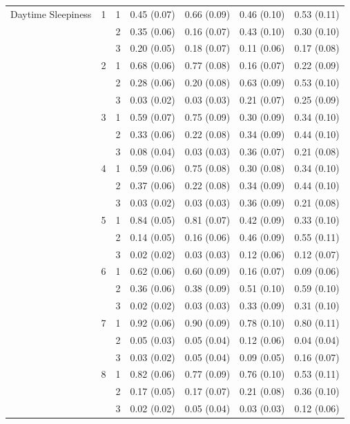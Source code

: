 \documentclass[11pt]{article}
\theoremstyle{plain}
\theoremstyle{definition}
\begin{document}
\begin{longtable}{clccccc}
Daytime Sleepiness &1 & 1  & 0.45 (0.07) & 0.66  (0.09) & 0.46  (0.10) & 0.53 (0.11) \\
 & & 2  & 0.35 (0.06) & 0.16  (0.07) & 0.43  (0.10) & 0.30 (0.10) \\
 & & 3  & 0.20 (0.05) & 0.18  (0.07) & 0.11  (0.06) & 0.17 (0.08) \\
&2 & 1  & 0.68 (0.06) & 0.77  (0.08) & 0.16  (0.07) & 0.22 (0.09) \\
 & & 2  & 0.28 (0.06) & 0.20  (0.08) & 0.63  (0.09) & 0.53 (0.10) \\
 & & 3  & 0.03 (0.02) & 0.03  (0.03) & 0.21  (0.07) & 0.25 (0.09) \\
&3 & 1  & 0.59 (0.07) & 0.75  (0.09) & 0.30  (0.09) & 0.34 (0.10) \\
&  & 2  & 0.33 (0.06) & 0.22  (0.08) & 0.34  (0.09) & 0.44 (0.10) \\
&  & 3  & 0.08 (0.04) & 0.03  (0.03) & 0.36  (0.07) & 0.21 (0.08) \\
&4 & 1  & 0.59 (0.06) & 0.75  (0.08) & 0.30  (0.08) & 0.34 (0.10) \\
&  & 2  & 0.37 (0.06) & 0.22  (0.08) & 0.34  (0.09) & 0.44 (0.10) \\
&  & 3  & 0.03 (0.02) & 0.03  (0.03) & 0.36  (0.09) & 0.21 (0.08) \\
&5 & 1  & 0.84 (0.05) & 0.81  (0.07) & 0.42  (0.09) & 0.33 (0.10) \\
&  & 2  & 0.14 (0.05) & 0.16  (0.06) & 0.46  (0.09) & 0.55 (0.11) \\
&  & 3  & 0.02 (0.02) & 0.03  (0.03) & 0.12  (0.06) & 0.12 (0.07) \\
&6 & 1  & 0.62  (0.06) & 0.60  (0.09) & 0.16  (0.07) & 0.09 (0.06) \\
&  & 2  & 0.36 (0.06) & 0.38  (0.09) & 0.51  (0.10) & 0.59 (0.10) \\
&  & 3  & 0.02 (0.02) & 0.03  (0.03) & 0.33  (0.09) & 0.31 (0.10) \\
&7 & 1  & 0.92 (0.06) & 0.90  (0.09) & 0.78  (0.10) & 0.80 (0.11) \\
&  & 2  & 0.05 (0.03) & 0.05  (0.04) & 0.12  (0.06) & 0.04 (0.04) \\
&  & 3  & 0.03 (0.02) & 0.05  (0.04) & 0.09  (0.05) & 0.16 (0.07) \\
&8 & 1  & 0.82 (0.06) & 0.77  (0.09) & 0.76  (0.10) & 0.53 (0.11) \\
&  & 2  & 0.17 (0.05) & 0.17  (0.07) & 0.21  (0.08) & 0.36 (0.10) \\
&  & 3  & 0.02 (0.02) & 0.05  (0.04) & 0.03 (0.03) &  0.12 (0.06)\\
\bottomrule

\end{longtable}
\end{document}
